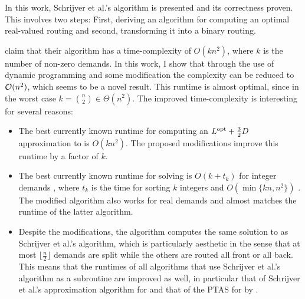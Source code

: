 In this work, Schrijver et al.'s algorithm is presented and its correctness proven.
This involves two steps: First, deriving an algorithm for computing an optimal real-valued routing and second, transforming it into a binary routing.

\citet{schrijver99} claim that their algorithm has a time-complexity of $O(k n^2)$, where $k$ is the number of non-zero demands.
In this work, I show that through the use of dynamic programming and some modification the complexity can be reduced to $\mathcal{O}(n^2)$, which seems to be a novel result.
This runtime is almost optimal, since in the worst case $k = \binom{n}{2} \in \Theta(n^2)$.
The improved time-complexity is interesting for several reasons:
\begin{itemize}
	\item The best currently known runtime for computing an $L^{\mathrm{opt}} + \frac{3}{2}D$ approximation to \RL is $O(k n^2)$.
	The proposed modifications improve this runtime by a factor of $k$.
	\item The best currently known runtime for solving \RRL is $O(k + t_k)$ for integer demands \cite{wang05}, where $t_k$ is the time for sorting $k$ integers and $O(\min\{kn, n^2\})$ \cite{myung04}.
	The modified algorithm also works for real demands and almost matches the runtime of the latter algorithm.
	\item Despite the modifications, the algorithm computes the same solution to \RRL as Schrijver et al.'s algorithm, which is particularly aesthetic in the sense that at most $\lfloor\frac{n}{2}\rfloor$ demands are split while the others are routed all front or all back.
	This means that the runtimes of all algorithms that use Schrijver et al.'s \RRL algorithm as a subroutine are improved as well, in particular that of Schrijver et al.'s approximation algorithm for \RL and that of the PTAS for \RL by \citet{khanna97}.
\end{itemize}


%
%
%
